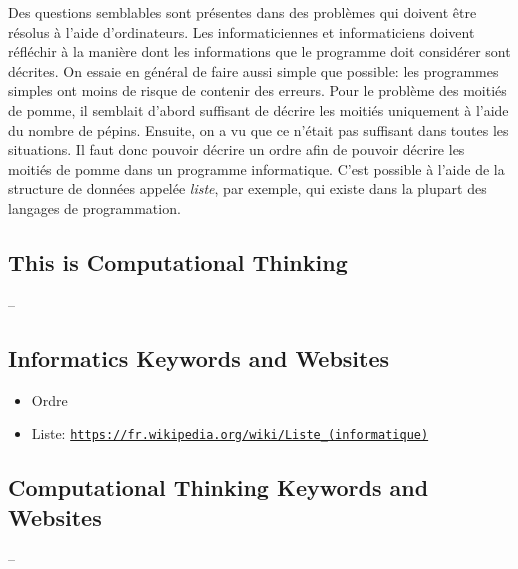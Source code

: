 \documentclass[a4paper,11pt]{report}
\newcommand{\BrochureUrlText}[1]{\texttt{#1}}
\begin{document}
Des questions semblables sont présentes dans des problèmes qui doivent être résolus à l’aide d’ordinateurs. Les informaticiennes et informaticiens doivent réfléchir à la manière dont les informations que le programme doit considérer sont décrites. On essaie en général de faire aussi simple que possible: les programmes simples ont moins de risque de contenir des erreurs. Pour le problème des moitiés de pomme, il semblait d’abord suffisant de décrire les moitiés uniquement à l’aide du nombre de pépins. Ensuite, on a vu que ce n’était pas suffisant dans toutes les situations. Il faut donc pouvoir décrire un ordre afin de pouvoir décrire les moitiés de pomme dans un programme informatique. C’est possible à l’aide de la structure de données appelée \emph{liste}, par exemple, qui existe dans la plupart des langages de programmation.


\subsection*{This is Computational Thinking}

–


\subsection*{Informatics Keywords and Websites}

\begin{itemize}
  \item Ordre
  \item Liste: \href{https://fr.wikipedia.org/wiki/Liste_(informatique)}{\BrochureUrlText{https://fr.wikipedia.org/wiki/Liste\_(informatique)}}
\end{itemize}


\subsection*{Computational Thinking Keywords and Websites}

–
\end{document}
